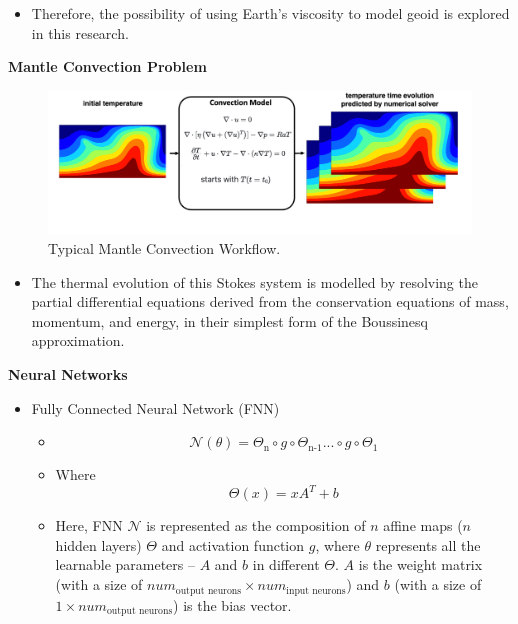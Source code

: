 {\begin{itemize}
     \item Therefore, the possibility of using Earth's viscosity to model geoid is explored in this research.
\end{itemize}

\textbf{Mantle Convection Problem}

\begin{figure}[H]
    \includegraphics[width=\linewidth]{figures/Mantle_Convection_workflow.png}
    \caption{Typical Mantle Convection Workflow.}
\end{figure}

\begin{itemize}
    \item The thermal evolution of this Stokes system is modelled by resolving the partial differential equations derived from the conservation equations of mass, momentum, and energy, in their simplest form of the Boussinesq approximation. 
\end{itemize}

\textbf{Neural Networks}
\begin{itemize}
    \item Fully Connected Neural Network (FNN)
        \begin{itemize}
            \item\begin{equation}
            \mathcal{N}(\theta) = \Theta_\text{n} \circ g \circ \Theta_\text{n-1} ... \circ g \circ \Theta_1
            \end{equation}

            \item Where \begin{equation} \Theta(x) = xA^{T} + b \end{equation}

            \item Here, FNN $\mathcal{N}$ is represented as the composition of $n$ affine maps ($n$ hidden layers) $\Theta$ and activation function $g$, where $\theta$ represents all the learnable parameters -- $A$ and $b$ in different $\Theta$. $A$ is the weight matrix (with a size of $num_\text{output neurons} \times num_\text{input neurons}$) and $b$ (with a size of $1 \times num_\text{output neurons}$) is the bias vector.


\end{itemize}
\end{itemize}}
